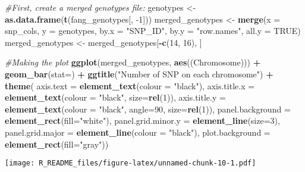 \documentclass[
]{article}
\newenvironment{Shaded}{\begin{snugshade}}{\end{snugshade}}
\newcommand{\CommentTok}[1]{\textcolor[rgb]{0.56,0.35,0.01}{\textit{#1}}}
\newcommand{\DataTypeTok}[1]{\textcolor[rgb]{0.13,0.29,0.53}{#1}}
\newcommand{\DecValTok}[1]{\textcolor[rgb]{0.00,0.00,0.81}{#1}}
\newcommand{\KeywordTok}[1]{\textcolor[rgb]{0.13,0.29,0.53}{\textbf{#1}}}
\newcommand{\NormalTok}[1]{#1}
\newcommand{\OperatorTok}[1]{\textcolor[rgb]{0.81,0.36,0.00}{\textbf{#1}}}
\newcommand{\OtherTok}[1]{\textcolor[rgb]{0.56,0.35,0.01}{#1}}
\newcommand{\StringTok}[1]{\textcolor[rgb]{0.31,0.60,0.02}{#1}}
\begin{document}
\begin{Shaded}
\begin{Highlighting}[]
\CommentTok{#First, create a merged genotypes file:}
\NormalTok{genotypes <-}\StringTok{ }\KeywordTok{as.data.frame}\NormalTok{(}\KeywordTok{t}\NormalTok{(fang_genotypes[, }\DecValTok{-1}\NormalTok{]))}
\NormalTok{merged_genotypes <-}\StringTok{ }\KeywordTok{merge}\NormalTok{(}\DataTypeTok{x =}\NormalTok{ snp_cols, }\DataTypeTok{y =}\NormalTok{ genotypes, }\DataTypeTok{by.x =} \StringTok{"SNP_ID"}\NormalTok{, }\DataTypeTok{by.y =} \StringTok{"row.names"}\NormalTok{, }\DataTypeTok{all.y =} \OtherTok{TRUE}\NormalTok{)}
\NormalTok{merged_genotypes <-}\StringTok{ }\NormalTok{merged_genotypes[}\OperatorTok{-}\KeywordTok{c}\NormalTok{(}\DecValTok{14}\NormalTok{, }\DecValTok{16}\NormalTok{), ]}

\CommentTok{#Making the plot}
\KeywordTok{ggplot}\NormalTok{(merged_genotypes, }\KeywordTok{aes}\NormalTok{((Chromosome))) }\OperatorTok{+}\StringTok{ }\KeywordTok{geom_bar}\NormalTok{(}\DataTypeTok{stat=}\NormalTok{) }\OperatorTok{+}\StringTok{ }\KeywordTok{ggtitle}\NormalTok{(}\StringTok{"Number of SNP on each chromosome"}\NormalTok{) }\OperatorTok{+}
\StringTok{     }\KeywordTok{theme}\NormalTok{(}
         \DataTypeTok{axis.text =} \KeywordTok{element_text}\NormalTok{(}\DataTypeTok{colour =} \StringTok{"black"}\NormalTok{),}
         \DataTypeTok{axis.title.x =} \KeywordTok{element_text}\NormalTok{(}\DataTypeTok{colour =} \StringTok{"black"}\NormalTok{, }\DataTypeTok{size=}\KeywordTok{rel}\NormalTok{(}\DecValTok{1}\NormalTok{)),}
         \DataTypeTok{axis.title.y =} \KeywordTok{element_text}\NormalTok{(}\DataTypeTok{colour =} \StringTok{"black"}\NormalTok{, }\DataTypeTok{angle=}\DecValTok{90}\NormalTok{, }\DataTypeTok{size=}\KeywordTok{rel}\NormalTok{(}\DecValTok{1}\NormalTok{)),}
         \DataTypeTok{panel.background =} \KeywordTok{element_rect}\NormalTok{(}\DataTypeTok{fill=}\StringTok{"white"}\NormalTok{),}
         \DataTypeTok{panel.grid.minor.y =} \KeywordTok{element_line}\NormalTok{(}\DataTypeTok{size=}\DecValTok{3}\NormalTok{),}
         \DataTypeTok{panel.grid.major =} \KeywordTok{element_line}\NormalTok{(}\DataTypeTok{colour =} \StringTok{"black"}\NormalTok{),}
         \DataTypeTok{plot.background =} \KeywordTok{element_rect}\NormalTok{(}\DataTypeTok{fill=}\StringTok{"gray"}\NormalTok{))  }
\end{Highlighting}
\end{Shaded}

\texttt{[image: R\_README\_files/figure-latex/unnamed-chunk-10-1.pdf]}
\end{document}
